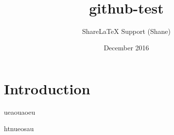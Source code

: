 \documentclass{article}
\title{github-test}
\author{ShareLaTeX Support (Shane)}
\date{December 2016}
\begin{document}
\maketitle

\section{Introduction}


ueaouaoeu

htnueosau
\end{document}
